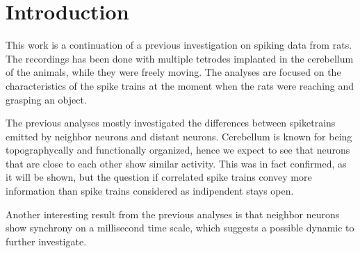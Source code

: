 \section{Introduction}

This work is a continuation of a previous investigation on spiking data from rats. The recordings has been done with multiple tetrodes implanted in the cerebellum of the animals, while they were freely moving. The analyses are focused on the characteristics of the spike trains at the moment when the rats were reaching and grasping an object. 

The previous analyses mostly investigated the differences between spiketrains emitted by neighbor neurons and distant neurons. Cerebellum is known for being topographycally and functionally organized, hence we expect to see that neurons that are close to each other show similar activity. This was in fact confirmed, as it will be shown, but the question if correlated spike trains convey more information than spike trains considered as indipendent stays open.

Another interesting result from the previous analyses is that neighbor neurons show synchrony on a millisecond time scale, which suggests a possible dynamic to further investigate.


